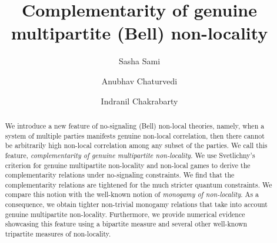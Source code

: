 \documentclass[%
 reprint,
 amsmath,amssymb,
 aps,
]{revtex4-1}
\theoremstyle{plain}
\begin{document}
\theoremstyle{definition}


\title{ Complementarity of genuine multipartite (Bell) non-locality}


\author{Sasha Sami}
\author{Anubhav Chaturvedi}
\author{Indranil Chakrabarty}
\begin{abstract}
We introduce a new feature of no-signaling (Bell) non-local theories, namely, when a system of multiple parties manifests genuine non-local correlation, then there cannot be arbitrarily high non-local correlation among any subset of the parties. We call this feature, \textit{complementarity of genuine multipartite non-locality}. We use Svetlichny's criterion for genuine multipartite non-locality and non-local games to derive the complementarity relations under no-signaling constraints. We find that the complementarity relations are tightened for the much stricter quantum constraints. We compare this notion with the well-known notion of \textit{monogamy of non-locality}. As a consequence, we obtain tighter non-trivial monogamy relations that take into account genuine multipartite non-locality. Furthermore, we provide numerical evidence showcasing this feature using a bipartite measure and several other well-known tripartite measures of non-locality. 
\end{abstract}

\maketitle 
\end{document}
